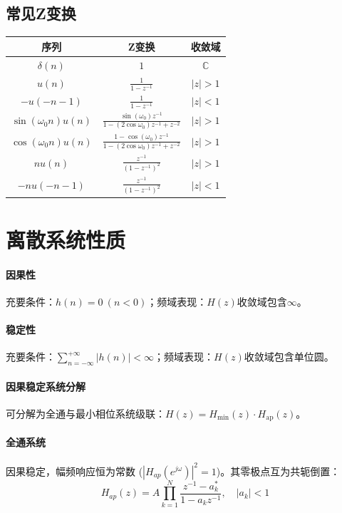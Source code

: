 \documentclass[8pt, a4paper]{extarticle}
\begin{document}
\begin{multicols}{4}
\subsection{常见Z变换}
{
\normalsize
\renewcommand{\arraystretch}{1.4}
\begin{tabularx}{\linewidth}{|C{1}|C{1.4}|C{0.6}|}
    \toprule
    序列 & Z变换 & 收敛域 \\
    \midrule
    \(\delta(n)\) & \(1\)  & \(\mathbb{C}\) \\
    \hline
    \(u(n)\) & \(\frac{1}{1-z^{-1}}\) & \(|z|>1\) \\
    \hline
    \(-u(-n-1)\) & \(\frac{1}{1-z^{-1}}\) & \(|z|<1\) \\
    \hline
    \(\sin(\omega_0 n)u(n)\) & \(\frac{\sin(\omega_0)z^{-1}}{1-(2\cos \omega_0)z^{-1}+z^{-2}}\) & \(|z|>1\) \\
    \hline
    \(\cos(\omega_0 n)u(n)\) & \(\frac{1-\cos(\omega_0)z^{-1}}{1-(2\cos \omega_0)z^{-1}+z^{-2}}\) & \(|z|>1\) \\
    \hline
    \(n u(n)\) & \(\frac{z^{-1}}{{(1-z^{-1})}^2}\) & \(|z|>1\) \\
    \hline
    \(-n u(-n-1)\) & \(\frac{z^{-1}}{{(1-z^{-1})}^2}\) & \(|z|<1\) \\
    \bottomrule
\end{tabularx}
}


\section{离散系统性质}
\paragraph{因果性} 充要条件：\(h(n) = 0 \ (n < 0)\)；频域表现：\(H(z)\)收敛域包含\(\infty\)。
\paragraph{稳定性} 充要条件：\(\sum_{n=-\infty}^{+\infty}|h(n)|<\infty\)；频域表现：\(H(z)\)收敛域包含单位圆。
\paragraph{因果稳定系统分解} 可分解为全通与最小相位系统级联：\(H(z) = H_{\text{min}}(z) \cdot H_{\text{ap}}(z)\)。
\paragraph{全通系统} 因果稳定，幅频响应恒为常数 (\(|H_{ap}(e^{j\omega})|^2 = 1\))。其零极点互为共轭倒置：
\[ H_{ap}(z) = A \prod_{k=1}^{N} \frac{z^{-1} - a_k^*}{1 - a_k z^{-1}},\quad |a_k|<1 \]

\end{multicols}
\end{document}
